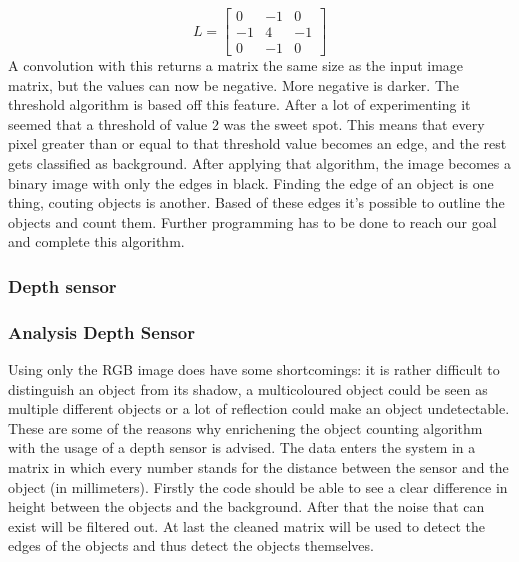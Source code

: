 \documentclass[11pt]{article}
\begin{document}
\begin{equation}
L =\begin{bmatrix}
	0&-1&0\\
	-1&4&-1\\
	0&-1&0
\end{bmatrix}
\end{equation}
A convolution with this returns a matrix the same size as the input image matrix, but the values can now be negative. More negative is darker. The threshold algorithm is based off this feature. After a lot of experimenting it seemed that a threshold of value 2 was the sweet spot. This means that every pixel greater than or equal to that threshold value becomes an edge, and the rest gets classified as background. After applying that algorithm, the image becomes a binary image with only the edges in black. Finding the edge of an object is one thing, couting objects is another. Based of these edges it's possible to outline the objects and count them. Further programming has to be done to reach our goal and complete this algorithm.


\subsubsection{Depth sensor}
\subsubsection{Analysis Depth Sensor}
Using only the RGB image does have some shortcomings: it is rather difficult to distinguish an object from its shadow, a multicoloured object could be seen as multiple different objects or a lot of reflection could make an object undetectable. These are some of the reasons why enrichening the object counting algorithm with the usage of a depth sensor is advised. The data enters the system in a matrix in which every number stands for the distance between the sensor and the object (in millimeters). Firstly the code should be able to see a clear difference in height between the objects and the background. After that the noise that can exist will be filtered out. At last the cleaned matrix will be used to detect the edges of the objects and thus detect the objects themselves.
 
\end{document}
